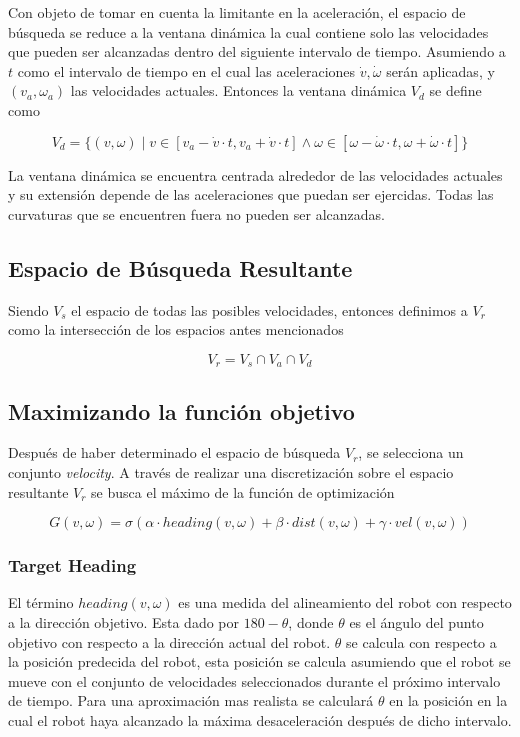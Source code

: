 \documentclass[12pt]{article}
\begin{document}
Con objeto de tomar en cuenta la limitante en la aceleración, el espacio de búsqueda se reduce a la ventana dinámica la cual contiene solo las velocidades que pueden ser alcanzadas dentro del siguiente intervalo de tiempo. Asumiendo a $t$ como el intervalo de tiempo en el cual las aceleraciones $\dot{v}, \dot{\omega}$ serán aplicadas, y $(v_a, \omega_a)$ las velocidades actuales. Entonces la ventana dinámica $V_d$ se define como

\begin{equation}
	V_d = 
		\{ (v, \omega) \mid 
			v \in \left[v_a - \dot{v} \cdot t, v_a + \dot{v} \cdot t\right]
			\wedge
			\omega \in \left[\omega - \dot{\omega} \cdot t, \omega + \dot{\omega} \cdot t\right]
		\}
\end{equation}

La ventana dinámica se encuentra centrada alrededor de las velocidades actuales y su extensión depende de las aceleraciones que puedan ser ejercidas. Todas las curvaturas que se encuentren fuera no pueden ser alcanzadas.

\subsection{Espacio de Búsqueda Resultante}

Siendo $V_s$ el espacio de todas las posibles velocidades, entonces definimos a $V_r$ como la intersección de los espacios antes mencionados

\begin{equation}
	V_r = V_s \cap V_a \cap V_d
\end{equation}

\subsection{Maximizando la función objetivo}

Después de haber determinado el espacio de búsqueda $V_r$, se selecciona un conjunto \emph{velocity}. A través de realizar una discretización sobre el espacio resultante $V_r$ se busca el máximo de la función de optimización

\begin{equation}
	G(v, \omega) = 
			\sigma(\alpha \cdot heading(v, \omega) + \beta \cdot dist(v, 					\omega) + \gamma \cdot vel(v, \omega))
\end{equation}

\subsubsection{Target Heading}
El término $heading(v, \omega)$ es una medida del alineamiento del robot con respecto a la dirección objetivo. Esta dado por $180 - \theta$, donde $\theta$ es el ángulo del punto objetivo con respecto a la dirección actual del robot. $\theta$ se calcula con respecto a la posición predecida del robot, esta posición se calcula asumiendo que el robot se mueve con el conjunto de velocidades seleccionados durante el próximo intervalo de tiempo. Para una aproximación mas realista se calculará $\theta$ en la posición en la cual el robot haya alcanzado la máxima desaceleración después de dicho intervalo.
\end{document}
